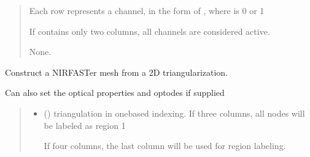 \documentclass[letterpaper,10pt,english]{sphinxmanual}
\begin{document}
\begin{fulllineitems}
\begin{fulllineitems}
\begin{quote}
\begin{description}
\begin{itemize}
\sphinxAtStartPar
Each row represents a channel, in the form of , where  is 0 or 1

\sphinxAtStartPar
If  contains only two columns, all channels are considered active.


\end{itemize}

\sphinxAtStartPar
None.

\end{description}\end{quote}

\end{fulllineitems}


\begin{fulllineitems}
\label{\detokenize{_autosummary/nirfasterff.base.fluor_mesh.fluormesh:nirfasterff.base.fluor_mesh.fluormesh.from_triangle}}
\pysigstartsignatures
{}
\pysigstopsignatures
\sphinxAtStartPar
Construct a NIRFASTer mesh from a 2D triangularization.

\sphinxAtStartPar
Can also set the optical properties and optodes if supplied
\begin{quote}\begin{description}
\begin{itemize}
\item {} 
\sphinxAtStartPar
{} () \textendash{} 
\sphinxAtStartPar
triangulation in one\sphinxhyphen{}based indexing. If three columns, all nodes will be labeled as region 1

\sphinxAtStartPar
If four columns, the last column will be used for region labeling.



\end{itemize}
\end{description}
\end{quote}
\end{fulllineitems}
\end{fulllineitems}
\end{document}
